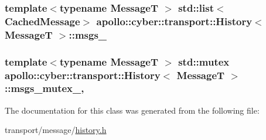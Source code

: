 \hypertarget{classapollo_1_1cyber_1_1transport_1_1History_a6e9ef1bf010e3890b0635309c59fe9ad}{
\subsubsection[{msgs\-\_\-}]{\setlength{\rightskip}{0pt plus 5cm}template$<$typename Message\-T $>$ std\-::list$<${\bf Cached\-Message}$>$ {\bf apollo\-::cyber\-::transport\-::\-History}$<$ Message\-T $>$\-::msgs\-\_\-\hspace{0.3cm}{\ttfamily [private]}}}\label{classapollo_1_1cyber_1_1transport_1_1History_a6e9ef1bf010e3890b0635309c59fe9ad}
\hypertarget{classapollo_1_1cyber_1_1transport_1_1History_ab0d0a8c6137aad70ce16d99a0bfcf381}{
\subsubsection[{msgs\-\_\-mutex\-\_\-}]{\setlength{\rightskip}{0pt plus 5cm}template$<$typename Message\-T $>$ std\-::mutex {\bf apollo\-::cyber\-::transport\-::\-History}$<$ Message\-T $>$\-::msgs\-\_\-mutex\-\_\-\hspace{0.3cm}{\ttfamily [mutable]}, {\ttfamily [private]}}}\label{classapollo_1_1cyber_1_1transport_1_1History_ab0d0a8c6137aad70ce16d99a0bfcf381}


The documentation for this class was generated from the following file\-:\begin{DoxyCompactItemize}
\item 
transport/message/\hyperlink{history_8h}{history.\-h}\end{DoxyCompactItemize}
